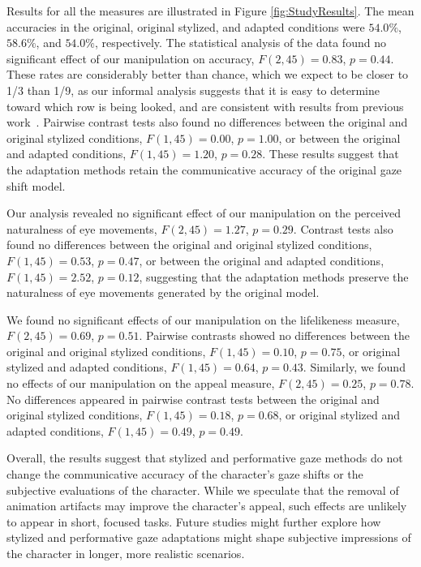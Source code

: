 Results for all the measures are illustrated in Figure \ref{fig:StudyResults}. The mean accuracies in the original, original stylized, and adapted conditions were $54.0\%$, $58.6\%$, and $54.0\%$, respectively. The statistical analysis of the data found no significant effect of our manipulation on accuracy, $F(2,45) = 0.83$, $p = 0.44$. These rates are considerably better than chance, which we expect to be closer to 1/3 than 1/9, as our informal analysis suggests that it is easy to determine toward which row is being looked, and are consistent with results from previous work~\citep{argyle1976gaze,goldberg1969visual,andrist2012designing}. Pairwise contrast tests also found no differences between the original and original stylized conditions, $F(1,45) = 0.00$, $p = 1.00$, or between the original and adapted conditions, $F(1,45) = 1.20$, $p = 0.28$. These results suggest that the adaptation methods retain the communicative accuracy of the original gaze shift model.

Our analysis revealed no significant effect of our manipulation on the perceived naturalness of eye movements, $F(2,45) = 1.27$, $p = 0.29$. Contrast tests also found no differences between the original and original stylized conditions, $F(1,45) = 0.53$, $p = 0.47$, or between the original and adapted conditions, $F(1,45) = 2.52$, $p = 0.12$, suggesting that the adaptation methods preserve the naturalness of eye movements generated by the original model.

We found no significant effects of our manipulation on the lifelikeness measure, $F(2,45) = 0.69$, $p = 0.51$. Pairwise contrasts showed no differences between the original and original stylized conditions, $F(1,45) = 0.10$, $p = 0.75$, or original stylized and adapted conditions, $F(1,45) = 0.64$, $p = 0.43$. Similarly, we found no effects of our manipulation on the appeal measure, $F(2,45) = 0.25$, $p = 0.78$. No differences appeared in pairwise contrast tests between the original and original stylized conditions, $F(1,45) = 0.18$, $p = 0.68$, or original stylized and adapted conditions, $F(1,45) = 0.49$, $p = 0.49$.

Overall, the results suggest that stylized and performative gaze methods do not change the communicative accuracy of the character's gaze shifts or the subjective evaluations of the character. While we speculate that the removal of animation artifacts may improve the character's appeal, such effects are unlikely to appear in short, focused tasks. Future studies might further explore how stylized and performative gaze adaptations might shape subjective impressions of the character in longer, more realistic scenarios. 